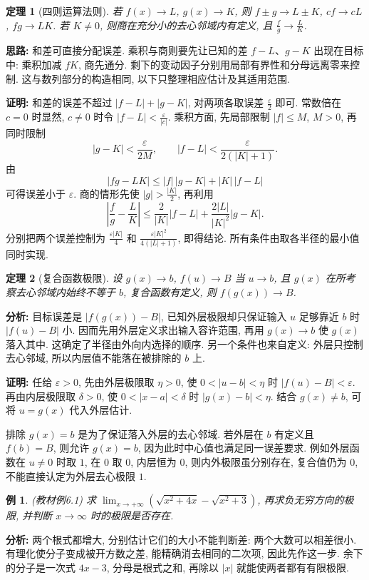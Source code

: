 \documentclass[UTF8,openany]{ctexbook}
\theoremstyle{chinesetextbook}
\newtheorem{example}{例}[section]
\newtheorem{theorem}{定理}[section]
\newenvironment{cnproof}{\par\indent\textbf{证明:} \ignorespaces}{\par}
\begin{document}
\begin{theorem}[四则运算法则]
若 $f(x)\to L$, $g(x)\to K$, 则 $f\pm g\to L\pm K$, $cf\to cL$, $fg\to LK$. 若 $K\ne0$, 则商在充分小的去心邻域内有定义, 且 $\displaystyle \frac fg\to\frac LK$.
\end{theorem}
\par\indent\textbf{思路:} 和差可直接分配误差. 乘积与商则要先让已知的差 $f-L$、$g-K$ 出现在目标中: 乘积加减 $fK$, 商先通分. 剩下的变动因子分别用局部有界性和分母远离零来控制. 这与数列部分的构造相同, 以下只整理相应估计及其适用范围.
\begin{cnproof}
和差的误差不超过 $|f-L|+|g-K|$, 对两项各取误差 $\displaystyle \frac\varepsilon2$ 即可. 常数倍在 $c=0$ 时显然, $c\ne0$ 时令 $\displaystyle |f-L|<\frac\varepsilon{|c|}$.
乘积方面, 先局部限制 $|f|\le M$, $M>0$, 再同时限制
\[
|g-K|<\frac\varepsilon{2M},\qquad |f-L|<\frac\varepsilon{2(|K|+1)}.
\]
由
\[
|fg-LK|\le |f|\,|g-K|+|K|\,|f-L|
\]
可得误差小于 $\varepsilon$. 商的情形先使 $\displaystyle |g|>\frac{|K|}{2}$, 再利用
\[
\left|\frac fg-\frac LK\right|
\le\frac2{|K|}|f-L|+\frac{2|L|}{|K|^2}|g-K|.
\]
分别把两个误差控制为 $\displaystyle \frac{\varepsilon|K|}{4}$ 和 $\displaystyle \frac{\varepsilon|K|^2}{4(|L|+1)}$, 即得结论. 所有条件由取各半径的最小值同时实现.
\end{cnproof}
\begin{theorem}[复合函数极限]
设 $g(x)\to b$, $f(u)\to B$ 当 $u\to b$, 且 $g(x)$ 在所考察去心邻域内始终不等于 $b$, 复合函数有定义, 则 $f(g(x))\to B$.
\end{theorem}
\par\indent\textbf{分析:} 目标误差是 $|f(g(x))-B|$, 已知外层极限却只保证输入 $u$ 足够靠近 $b$ 时 $|f(u)-B|$ 小. 因而先用外层定义求出输入容许范围, 再用 $g(x)\to b$ 使 $g(x)$ 落入其中. 这确定了半径由外向内选择的顺序. 另一个条件也来自定义: 外层只控制去心邻域, 所以内层值不能落在被排除的 $b$ 上.

\begin{cnproof}
任给 $\varepsilon>0$, 先由外层极限取 $\eta>0$, 使 $0<|u-b|<\eta$ 时 $|f(u)-B|<\varepsilon$. 再由内层极限取 $\delta>0$, 使 $0<|x-a|<\delta$ 时 $|g(x)-b|<\eta$. 结合 $g(x)\ne b$, 可将 $u=g(x)$ 代入外层估计.
\end{cnproof}
排除 $g(x)=b$ 是为了保证落入外层的去心邻域. 若外层在 $b$ 有定义且 $f(b)=B$, 则允许 $g(x)=b$, 因为此时中心值也满足同一误差要求. 例如外层函数在 $u\ne0$ 时取 $1$, 在 $0$ 取 $0$, 内层恒为 $0$, 则内外极限虽分别存在, 复合值仍为 $0$, 不能直接认定为外层去心极限 $1$.
\begin{example}
(教材例6.1) 求 $\displaystyle \lim_{x\to+\infty}(\sqrt{x^2+4x}-\sqrt{x^2+3})$, 再求负无穷方向的极限, 并判断 $x\to\infty$ 时的极限是否存在.
\end{example}
\par\indent\textbf{分析:} 两个根式都增大, 分别估计它们的大小不能判断差: 两个大数可以相差很小. 有理化使分子变成被开方数之差, 能精确消去相同的二次项, 因此先作这一步. 余下的分子是一次式 $4x-3$, 分母是根式之和, 再除以 $|x|$ 就能使两者都有有限极限.
\end{document}
